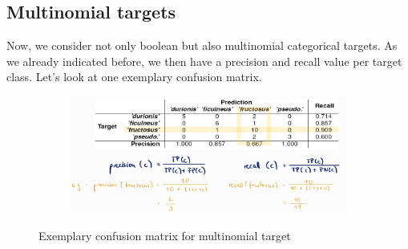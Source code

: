 \subsection{Multinomial targets}
Now, we consider not only boolean but also multinomial categorical targets. As we already indicated before, we then have a precision and recall value per target class. Let's look at one exemplary confusion matrix.


\begin{figure}[H]
  \centering
  \begin{subfigure}{0.7\textwidth}
    \centering
    \includegraphics[width=\textwidth]{assets/sl/mt__example.jpg}
  \end{subfigure}

  \caption{Exemplary confusion matrix for multinomial target}
  \label{fig:7_mt_example}
\end{figure}
